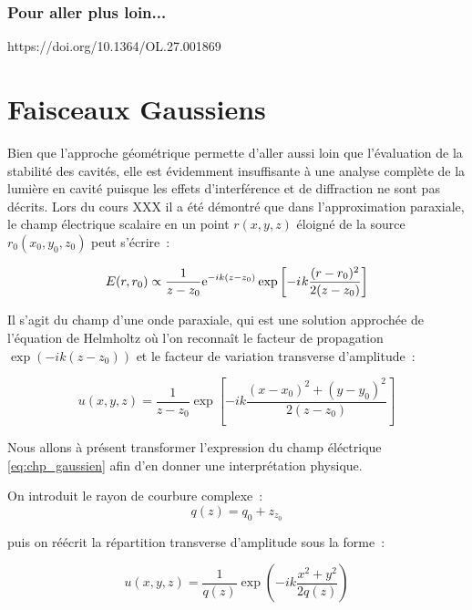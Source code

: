 \documentclass[a4paper]{book}
\newcommand{\iu}{{i\mkern1mu}}
\begin{document}
\subsection{Pour aller plus loin...}
https://doi.org/10.1364/OL.27.001869

\chapter{Faisceaux Gaussiens}

Bien que l'approche géométrique permette d'aller aussi loin que l'évaluation de la stabilité des cavités, elle est évidemment insuffisante à une analyse complète de la lumière en cavité puisque les effets d'interférence et de diffraction ne sont pas décrits. Lors du cours XXX il a été démontré que dans l'approximation paraxiale, le champ électrique scalaire en un point $r(x, y, z)$ éloigné de la source $r_0(x_0, y_0, z_0)$ peut s'écrire~: 

\begin{equation}
    E(r,r_0) \propto \frac{1}{z-z_0}\mathrm{e}^{-ik(z-z_0)}\exp\left[-\iu k\frac{(r - r_0)^2}{2(z - z_0)}\right]
    \label{eq:chp_gaussien}
\end{equation}


Il s'agit du champ d'une onde paraxiale, qui est une solution approchée de l'équation de Helmholtz où l'on reconnaît le facteur de propagation $\exp(-ik(z-z_0))$ et le facteur de variation transverse d'amplitude~:

\begin{equation}
    u(x, y, z) = \frac{1}{z-z_0}\exp\left[-ik\frac{(x-x_0)^2+(y-y_0)^2}{2(z-z_0)}\right]
\end{equation}

Nous allons à présent transformer l'expression du champ éléctrique \ref{eq:chp_gaussien} afin d'en donner une interprétation physique. 

On introduit le rayon de courbure complexe~: 
\begin{equation}
    q(z)=q_0+z_{z_{0}}
\end{equation}

puis on réécrit la répartition transverse d'amplitude sous la forme~: 

\begin{equation}
    u(x, y, z) = \frac{1}{q(z)}\exp\left(-ik\frac{x^2+y^2}{2q(z)}\right)
\end{equation}
\end{document}
